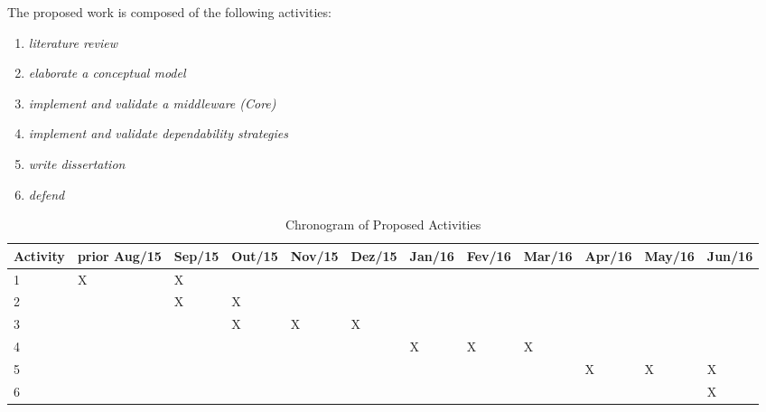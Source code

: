 The proposed work is composed of the following activities:

\begin{enumerate}
\item \emph{literature review}
\item \emph{elaborate a conceptual model}
\item \emph{implement and validate a middleware (Core)}
\item \emph{implement and validate dependability strategies}
\item \emph{write dissertation}
\item \emph{defend}


\end{enumerate}

\begin{table}[htbp]
\tiny
\begin{flushleft}
\begin{tabular}{|p{1.1cm}|p{0.75cm}|p{0.75cm}|p{0.75cm}|p{0.75cm}|p{0.75cm}|p{0.75cm}|p{0.75cm}|p{0.75cm}|p{0.75cm}|p{0.75cm}|p{0.75cm}|}
\hline
\textbf{Activity}&	\textbf{prior Aug/15}&	\textbf{Sep/15}&	\textbf{Out/15}&	\textbf{Nov/15}&	\textbf{Dez/15}&	\textbf{Jan/16}&	\textbf{Fev/16}&	\textbf{Mar/16}&	\textbf{Apr/16}&	\textbf{May/16}&	\textbf{Jun/16}\\
\hline	1			&	X	&	 X  &	 		&			&		&		&	 		&	 		&	 	&		 &				\\
\hline	2			&		&	 X	&	 X	&			&		&		&	 		&	 		&	 	&		 &				\\
\hline	3			&		&	  	&	 X	&	X	  &	X	&		&	 	  &	   	&	 	&		 &				\\
\hline	4			&		&	 		&	 		&			&		&	X	&	 X	&	 X	&	  &		 &				\\
\hline	5			&		&	 		&	 		&			&		&		&	 		&	 		&	X	&	X	 &	X			\\
\hline	6			&		&	 		&	 		&			&		&		&	 		&	 		&	  &		 &	X			\\
\hline
\end{tabular}
\end{flushleft}
\caption{Chronogram of Proposed Activities}
\label{tbcrono}
\end{table}
